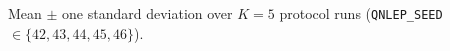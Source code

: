 Mean $\pm$ one standard deviation over $K=5$ protocol runs (\texttt{QNLEP\_SEED} $\in \{42, 43, 44, 45, 46\}$).
